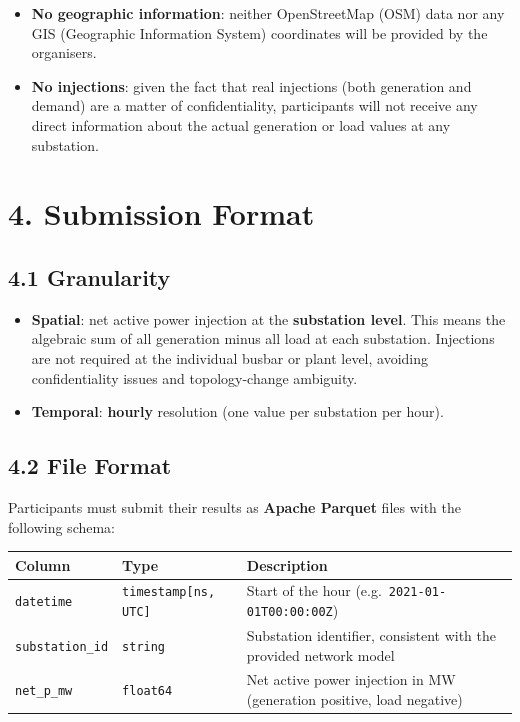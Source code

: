 \documentclass[11pt,a4paper]{article}
\begin{document}
\begin{itemize}[nosep]
  \item \textbf{No geographic information}: neither OpenStreetMap (OSM) data nor any GIS (Geographic Information System) coordinates will be provided by the organisers.
  \item \textbf{No injections}: given the fact that real injections (both generation and demand) are a matter of confidentiality, participants will not receive any direct information about the actual generation or load values at any substation.
\end{itemize}

\section{4. Submission Format}

\subsection{4.1 Granularity}

\begin{itemize}[nosep]
  \item \textbf{Spatial}: net active power injection at the \textbf{substation level}. This means the algebraic sum of all generation minus all load at each substation. Injections are not required at the individual busbar or plant level, avoiding confidentiality issues and topology-change ambiguity.
  \item \textbf{Temporal}: \textbf{hourly} resolution (one value per substation per hour).
\end{itemize}

\subsection{4.2 File Format}

Participants must submit their results as \textbf{Apache Parquet} files with the following schema:

\begin{table}[h]
\centering
\small
\begin{tabular}{llp{}}
\toprule
\textbf{Column} & \textbf{Type} & \textbf{Description} \\
\midrule
\texttt{datetime} & \texttt{timestamp[ns, UTC]} & Start of the hour (e.g.\ \texttt{2021-01-01T00:00:00Z}) \\[3pt]
\texttt{substation\_id} & \texttt{string} & Substation identifier, consistent with the provided network model \\[3pt]
\texttt{net\_p\_mw} & \texttt{float64} & Net active power injection in MW (generation positive, load negative) \\
\bottomrule
\end{tabular}
\end{table}
\end{document}
